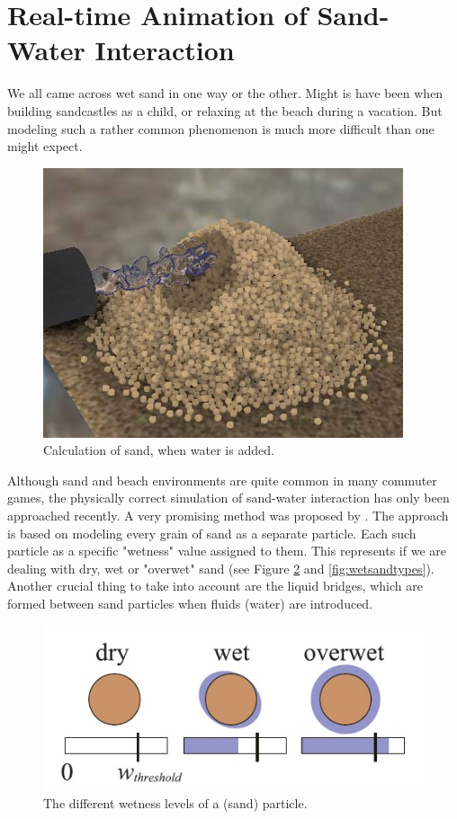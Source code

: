 \section{Real-time Animation of Sand-Water Interaction}
We all came across wet sand in one way or the other. Might is have been when building sandcastles as a child, or relaxing at the beach during a vacation. But modeling such a rather common phenomenon is much more difficult than one might expect.

\begin{figure}[htb]
	\centering
	\includegraphics[width=\linewidth]{RSKN08/pileofsand.jpg}
	\caption{Calculation of sand, when water is added.}
	\label{fig:pileofsand}
\end{figure}

Although sand and beach environments are quite common in many commuter games, the physically correct simulation of sand-water interaction has only been approached recently. A very promising method was proposed by \cite{rungjiratananon2008real}. The approach is based on modeling every grain of sand as a separate particle. Each such particle as a specific "wetness" value assigned to them. This represents if we are dealing with dry, wet or "overwet" sand (see Figure \ref{fig:wetness} and \ref{fig:wetsandtypes}). Another crucial thing to take into account are the liquid bridges, which are formed between sand particles when fluids (water) are introduced.

\begin{figure}[htb]
	\centering
	\includegraphics[width=\linewidth]{RSKN08/wetness.jpg}
	\caption{The different wetness levels of a (sand) particle.}
	\label{fig:wetness}
\end{figure}

